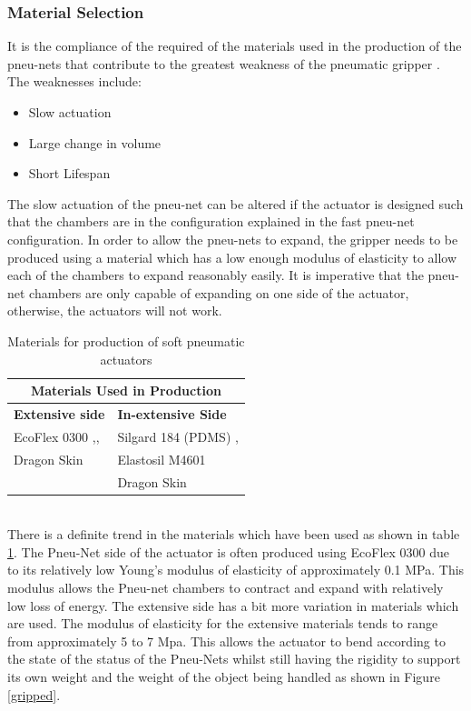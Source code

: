 \documentclass[11pt,twocolumn]{article}
\begin{document}
\subsubsection{Material Selection}
It is the compliance of the required of the materials used in the production of the pneu-nets that contribute to the greatest weakness of the pneumatic gripper \cite{shepherd2011multigait}. The weaknesses include:
\begin{itemize}
\item Slow actuation
\item Large change in volume
\item Short Lifespan
\end{itemize}
The slow actuation of the pneu-net can be altered if the actuator is designed such that the chambers are in the configuration explained in the fast pneu-net configuration. In order to allow the pneu-nets to expand, the gripper needs to be produced using a material which has a low enough modulus of elasticity to allow each of the chambers to expand reasonably easily. It is imperative that the pneu-net chambers are only capable of expanding on one side of the actuator, otherwise, the actuators will not work.
\newline
\begin{table}[!h]
\caption{Materials for production of soft pneumatic actuators}
\label{Pneumatic_table}
\centering
\begin{tabular}{ |p{4cm}|p{4cm}| }
 \hline
 \multicolumn{2}{|c|}{\textbf{Materials Used in Production}} \\
 \hline
 \textbf{Extensive side} & \textbf{In-extensive Side}\\
 \hline
 EcoFlex 0300 \cite{ilievski2011soft},\cite{bilodeau2015monolithic},\cite{mosadegh2014pneumatic}   & Silgard 184 (PDMS)  \cite{ilievski2011soft},\cite{bilodeau2015monolithic} \\
 Dragon Skin \cite{hao2016universal} &   Elastosil M4601 \cite{mosadegh2014pneumatic}\\
 & Dragon Skin \cite{hao2016universal}\\
 \hline
\end{tabular}
\end{table}
\\
\newline
There is a definite trend in the materials which have been used as shown in table \ref{Pneumatic_table}. The Pneu-Net side of the actuator is often produced using EcoFlex 0300 due to its relatively low Young's modulus of elasticity of approximately 0.1 MPa. This modulus allows the Pneu-net chambers to contract and expand with relatively low loss of energy. The extensive side has a bit more variation in materials which are used. The modulus of elasticity for the extensive materials tends to range from approximately 5 to 7 Mpa. This allows the actuator to bend according to the state of the status of the Pneu-Nets whilst still having the rigidity to support its own weight and the weight of the object being handled as shown in Figure \ref{gripped}.
\end{document}
